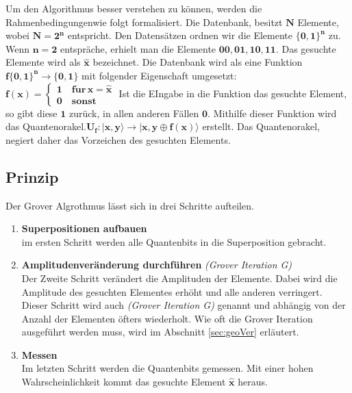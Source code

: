Um den Algorithmus besser verstehen zu können, werden die Rahmenbedingungenwie folgt formalisiert. Die Datenbank, besitzt $\mathbf{N}$ Elemente, wobei  $\mathbf{N = 2^n}$ entspricht. Den Datensätzen ordnen wir die Elemente $\mathbf{ \{ 0,1 \}^n}$ zu. Wenn $\mathbf{ n=2}$ entspräche, erhielt man die Elemente $\mathbf{00,01,10,11}$. Das gesuchte Elemente wird als $\mathbf{\hat{x}}$ bezeichnet. Die Datenbank wird als eine Funktion $\mathbf{f \{ 0,1 \}^n  \rightarrow \{ 0,1 \}}$ mit folgender Eigenschaft umgesetzt: \\
$\mathbf{f(x) = \begin{cases}1 \quad f\ddot{u}r \,
		x = \hat x \\0 \quad sonst \end{cases} 
}$ 
\newline
Ist die EIngabe in die Funktion das gesuchte Element, so gibt diese $\mathbf{1}$ zurück, in allen anderen Fällen $\mathbf{0}$. 
Mithilfe dieser Funktion wird das Quantenorakel.$\mathbf{U_f : | x,y \rangle \to |x,y \oplus f(x) \rangle}$ erstellt. Das Quantenorakel, negiert daher das Vorzeichen des gesuchten Elements. 

\subsection{Prinzip}
Der Grover Algrothmus lässt sich in drei Schritte aufteilen.
\begin{enumerate}
	\item \textbf{Superpositionen aufbauen}
	\\
	im ersten Schritt werden alle Quantenbits in die Superposition gebracht.
	\item \textbf{Amplitudenveränderung durchführen} \emph{(Grover Iteration G)}
	\\
	Der Zweite Schritt verändert die Amplituden der Elemente. Dabei wird die Amplitude des gesuchten Elementes erhöht und alle anderen verringert. Dieser Schritt wird auch \emph{(Grover Iteration G)} genannt und abhängig von der Anzahl der Elementen öfters wiederholt. Wie oft die Grover Iteration ausgeführt werden muss, wird im Abschnitt \ref{sec:geoVer} erläutert.
	\item \textbf{Messen} 
	\\
	Im letzten Schritt werden die Quantenbits gemessen. Mit einer hohen Wahrscheinlichkeit kommt das gesuchte Element $\mathbf{\hat x}$ heraus.
\end{enumerate}

